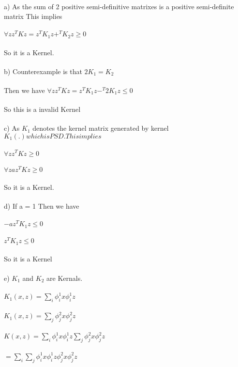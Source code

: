\newcommand\tab[1][1cm]{\hspace*{#1}}
\begin{answer}
\\ \\
a) As the sum of 2 positive semi-definitive matrixes is a positive semi-definite matrix This implies \\ \\
\tab[2cm]$\forall z z^TKz=z^TK_1z+^TK_2z  \geq 0$ \\ \\
So it is a Kernel. \\ \\
b) Counterexample is that $2K_1=K_2$ \\ \\
\tab Then we have $\forall z z^TKz=z^TK_1z-^T2K_1z  \leq 0$\\ \\
So this is a invalid Kernel \\ \\
c) As $K_1$ denotes the kernel matrix generated by kernel $K_1(.) which is PSD. This implies$ \\ \\
\tab  $\forall z z^T K z  \geq 0 $ \\ \\ 
\tab  $\forall z az^T K z  \geq 0 $ \\ \\ 
So it is a Kernel. \\ \\
d) If a = 1 Then we have \\ \\
\tab $-az^TK_1z \leq 0$\\ \\
\tab $z^TK_1z \leq 0$\\ \\
So it is a Kernel\\ \\
e) $K_1$ and $K_2$ are Kernals. \\ \\
\tab $K_1(x,z) = \sum_i\phi_i^1x\phi_i^1z$ \\ \\
\tab $K_1(x,z) = \sum_j\phi_j^2x\phi_j^2z$ \\ \\
\tab $K(x,z) = \sum_i\phi_i^1x\phi_i^1z \sum_j\phi_j^2x\phi_j^2z$ \\ \\
\tab[2cm] $ = \sum_i\sum_j \phi_i^1x\phi_i^1z \phi_j^2x\phi_j^2z$ \\ \\

\end{answer}
